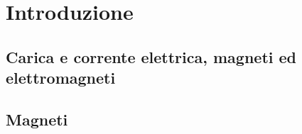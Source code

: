 
\chapter{Introduzione}
\section{Carica e corrente elettrica, magneti ed elettromagneti}
\section{Magneti}

\chapter{}
\chapter{}
